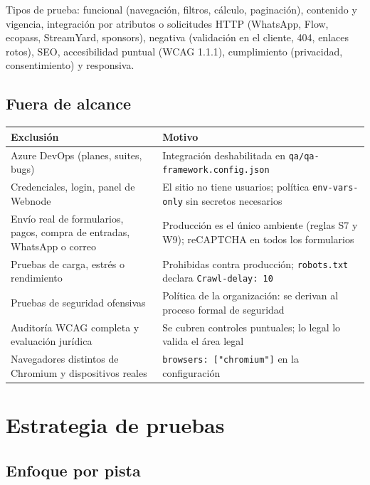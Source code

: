 \documentclass[11pt,a4paper]{article}
\begin{document}
Tipos de prueba: funcional (navegación, filtros, cálculo, paginación), contenido y vigencia,
integración por atributos o solicitudes HTTP (WhatsApp, Flow, ecopass, StreamYard, sponsors),
negativa (validación en el cliente, 404, enlaces rotos), SEO, accesibilidad puntual (WCAG 1.1.1),
cumplimiento (privacidad, consentimiento) y responsiva.

\subsection{Fuera de alcance}

\begin{table}[H]
\centering\small
\begin{tabularx}{\textwidth}{@{}>{\raggedright\arraybackslash}p{} X@{}}
\toprule
Exclusión & Motivo \\
\midrule
Azure DevOps (planes, suites, bugs) & Integración deshabilitada en \texttt{qa/qa-framework.config.json} \\
Credenciales, login, panel de Webnode & El sitio no tiene usuarios; política \texttt{env-vars-only} sin secretos necesarios \\
Envío real de formularios, pagos, compra de entradas, WhatsApp o correo & Producción es el único ambiente (reglas S7 y W9); reCAPTCHA en todos los formularios \\
Pruebas de carga, estrés o rendimiento & Prohibidas contra producción; \texttt{robots.txt} declara \texttt{Crawl-delay: 10} \\
Pruebas de seguridad ofensivas & Política de la organización: se derivan al proceso formal de seguridad \\
Auditoría WCAG completa y evaluación jurídica & Se cubren controles puntuales; lo legal lo valida el área legal \\
Navegadores distintos de Chromium y dispositivos reales & \texttt{browsers: ["chromium"]} en la configuración \\
\bottomrule
\end{tabularx}
\end{table}

\section{Estrategia de pruebas}

\subsection{Enfoque por pista}
\end{document}

